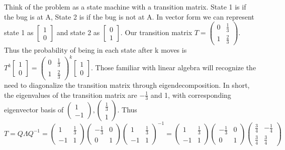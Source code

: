 \begin{enumerate}
Think of the problem as a state machine with a transition matrix. State 1 is if the bug is at A, State 2 is if the bug is not at A. In vector form we can represent state 1 as $\begin{bmatrix} 1 \\ 0 \end{bmatrix}$ and state 2 as $\begin{bmatrix} 0 \\ 1 \end{bmatrix}$. Our transition matrix $T =\begin{pmatrix} 0 & \frac{1}{3} \\ 1 & \frac{2}{3} \end{pmatrix}$. Thus the probability of being in each state after k moves is $T^{k}\begin{bmatrix} 1 \\ 0 \end{bmatrix}=\begin{pmatrix} 0 & \frac{1}{3} \\ 1 & \frac{2}{3} \end{pmatrix}^{k}\begin{bmatrix} 1 \\ 0 \end{bmatrix}$. Those familiar with linear algebra will recognize the need to diagonalize the transition matrix through eigendecomposition. In short, the eigenvalues of the transition matrix are $-\frac{1}{3}$ and 1, with corresponding eigenvector basis of $\begin{pmatrix} 1 \\ -1 \end{pmatrix},  \begin{pmatrix} \frac{1}{3} \\ 1 \end{pmatrix}$. Thus $T = Q \Lambda Q^{-1} = \begin{pmatrix} 1 & \frac{1}{3} \\ -1 & 1 \end{pmatrix}\begin{pmatrix} -\frac{1}{3} & 0\\ 0 & 1 \end{pmatrix}\begin{pmatrix} 1 & \frac{1}{3}\\ -1 & 1 \end{pmatrix}^{-1} = \begin{pmatrix} 1 & \frac{1}{3} \\ -1 & 1 \end{pmatrix}\begin{pmatrix} -\frac{1}{3} & 0\\ 0 & 1 \end{pmatrix}\begin{pmatrix} \frac{3}{4} & -\frac{1}{4}\\ \frac{3}{4} & \frac{3}{4} \end{pmatrix}$


\end{enumerate}
